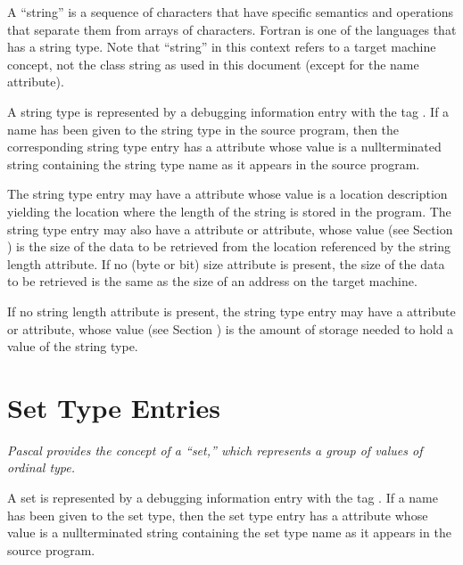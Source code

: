 A ``string'' is a sequence of characters that have specific
semantics and operations that separate them from arrays of
characters. Fortran is one of the languages that has a string
type. Note that ``string'' in this context refers to a target
machine concept, not the class string as used in this document
(except for the name attribute).

A string type is represented by a debugging information entry
with the tag . 
If a name has been given to
the string type in the source program, then the corresponding
string type entry has a  attribute whose value is
a null\dash terminated string containing the string type name as
it appears in the source program.

The string type entry may have a  attribute
whose value is a location description yielding the location
where the length of the string is stored in the program. The
string type entry may also have a  attribute
or  attribute, whose value 
(see Section ) 
is the size of the data to be retrieved from the location
referenced by the string length attribute. If no (byte or bit)
size attribute is present, the size of the data to be retrieved
is the same as the size of an address on the target machine.

If no string length attribute is present, the string type
entry may have a  attribute or 
attribute, whose value 
(see Section ) 
is the amount of
storage needed to hold a value of the string type.


\section{Set Type Entries}
\label{chap:settypeentries}

\textit{Pascal provides the concept of a “set,” which represents
a group of values of ordinal type.}

A set is represented by a debugging information entry with
the tag . 
If a name has been given to the
set type, then the set type entry has a  attribute
whose value is a null\dash terminated string containing the
set type name as it appears in the source program.

